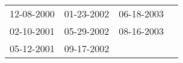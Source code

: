 \begin{supertabular}{llll}
 12-08-2000 &  01-23-2002 &  06-18-2003 \\
 02-10-2001 &  05-29-2002 &  08-16-2003 \\
 05-12-2001 &  09-17-2002 &             \\
\end{supertabular}
